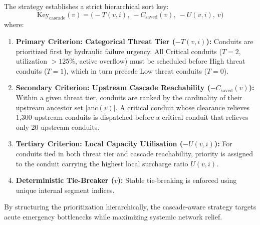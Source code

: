 \documentclass[12pt,a4paper]{report}
\begin{document}
The strategy establishes a strict hierarchical sort key:
\begin{equation}
\text{Key}_{\text{cascade}}(v) = \Big(-T(v, i),~ -C_{\text{saved}}(v),~ -U(v, i),~ v\Big)
\label{eqn:cascade_sort_key}
\end{equation}
where:
\begin{enumerate}
    \item \textbf{Primary Criterion: Categorical Threat Tier ($-T(v, i)$):} Conduits are prioritized first by hydraulic failure urgency. All Critical conduits ($T = 2$, utilization $> 125\%$, active overflow) must be scheduled before High threat conduits ($T = 1$), which in turn precede Low threat conduits ($T = 0$).
    \item \textbf{Secondary Criterion: Upstream Cascade Reachability ($-C_{\text{saved}}(v)$):} Within a given threat tier, conduits are ranked by the cardinality of their upstream ancestor set $|\text{anc}(v)|$. A critical conduit whose clearance relieves 1,300 upstream conduits is dispatched before a critical conduit that relieves only 20 upstream conduits.
    \item \textbf{Tertiary Criterion: Local Capacity Utilisation ($-U(v, i)$):} For conduits tied in both threat tier and cascade reachability, priority is assigned to the conduit carrying the highest local surcharge ratio $U(v, i)$.
    \item \textbf{Deterministic Tie-Breaker ($v$):} Stable tie-breaking is enforced using unique internal segment indices.
\end{enumerate}

By structuring the prioritization hierarchically, the cascade-aware strategy targets acute emergency bottlenecks while maximizing systemic network relief.
\end{document}
